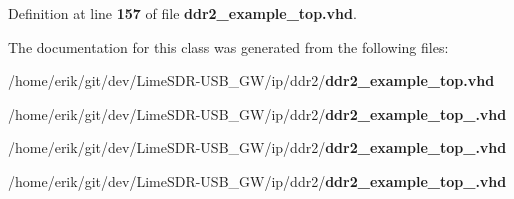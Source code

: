Definition at line {\bf 157} of file {\bf ddr2\+\_\+example\+\_\+top.\+vhd}.



The documentation for this class was generated from the following files\+:\begin{DoxyCompactItemize}
\item 
/home/erik/git/dev/\+Lime\+S\+D\+R-\/\+U\+S\+B\+\_\+\+G\+W/ip/ddr2/{\bf ddr2\+\_\+example\+\_\+top.\+vhd}\item 
/home/erik/git/dev/\+Lime\+S\+D\+R-\/\+U\+S\+B\+\_\+\+G\+W/ip/ddr2/{\bf ddr2\+\_\+example\+\_\+top\+\_.\+vhd}\item 
/home/erik/git/dev/\+Lime\+S\+D\+R-\/\+U\+S\+B\+\_\+\+G\+W/ip/ddr2/{\bf ddr2\+\_\+example\+\_\+top\+\_.\+vhd}\item 
/home/erik/git/dev/\+Lime\+S\+D\+R-\/\+U\+S\+B\+\_\+\+G\+W/ip/ddr2/{\bf ddr2\+\_\+example\+\_\+top\+\_.\+vhd}\end{DoxyCompactItemize}
